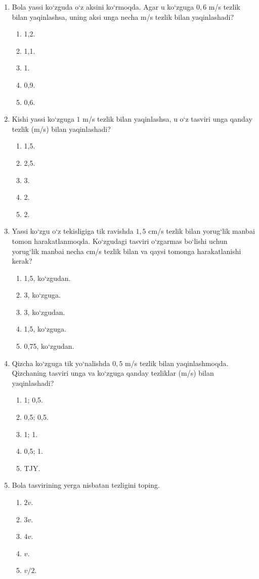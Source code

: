 \begin{enumerate}
\item Bola yassi ko‘zguda o‘z aksini ko‘rmoqda. Agar u ko‘zguga $0,6$ m/s tezlik bilan yaqinlashsa, uning aksi unga necha m/s tezlik bilan yaqinlashadi?
\begin{enumerate}[label=\Alph*)]
\item 1,2.
\item 1,1.
\item 1.
\item 0,9.
\item 0,6.
\end{enumerate}

\item Kishi yassi ko‘zguga $1$ m/s tezlik bilan yaqinlashsa, u o‘z tasviri unga qanday tezlik (m/s) bilan yaqinlashadi?
\begin{enumerate}[label=\Alph*)]
\item 1,5.
\item 2,5.
\item 3.
\item 2.
\item 2.
\end{enumerate}

\item Yassi ko‘zgu o‘z tekisligiga tik ravishda $1,5$ cm/s tezlik bilan yorug‘lik manbai tomon harakatlanmoqda. Ko‘zgudagi tasviri o‘zgarmas bo‘lishi uchun yorug‘lik manbai necha cm/s tezlik bilan va qaysi tomonga harakatlanishi kerak?
\begin{enumerate}[label=\Alph*)]
\item 1,5, ko‘zgudan.
\item 3, ko‘zguga.
\item 3, ko‘zgudan.
\item 1,5, ko‘zguga.
\item 0,75, ko‘zgudan.
\end{enumerate}

\item Qizcha ko‘zguga tik yo‘nalishda $0,5$ m/s tezlik bilan yaqinlashmoqda. Qizchaning tasviri unga va ko‘zguga qanday tezliklar (m/s) bilan yaqinlashadi?
\begin{enumerate}[label=\Alph*)]
\item 1; 0,5.
\item 0,5; 0,5.
\item 1; 1.
\item 0,5; 1.
\item TJY.
\end{enumerate}

\item Bola tasvirining yerga nisbatan tezligini toping.
\begin{enumerate}[label=\Alph*)]
\item $2v$.
\item $3v$.
\item $4v$.
\item $v$.
\item $v/2$.
\end{enumerate}


\end{enumerate}
